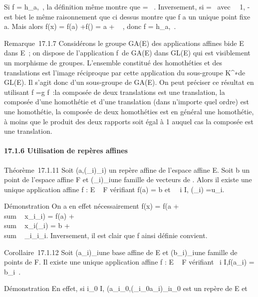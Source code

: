 \documentclass[]{article}
\begin{document}
Si f = h\_a,\lambda~, la définition même montre que
\vecf = \lambda~\mathrmId. Inversement,
si \vecf = \lambda~\mathrmId avec
\lambda~\neq~1, \vecf
-\mathrmId est bi\jmathective et le même raisonnement que
ci dessus montre que f a un unique point fixe a. Mais alors f(x) = f(a)
+\vec f(\overrightarrowax) = a + \lambda~
\overrightarrowax, donc f = h\_a,\lambda~.

Remarque~17.1.7 Considérons le groupe GA(E) des applications affines
bi\jmathectives de E dans E~; on dispose de l'application
f\mapsto~\vecf de GA(E) dans
GL(E) qui est visiblement un morphisme de groupes. L'ensemble constitué
des homothéties et des translations est l'image réciproque par cette
application du sous-groupe K^∗\mathrmId de
GL(E). Il s'agit donc d'un sous-groupe de GA(E). On peut préciser ce
résultat en utilisant \overrightarrowg \cdot f
=\vec g \cdot\vec f~:la composée de
deux translations est une translation, la composée d'une homothétie et
d'une translation (dans n'importe quel ordre) est une homothétie, la
composée de deux homothéties est en général une homothétie, à moins que
le produit des deux rapports soit égal à 1 auquel cas la composée est
une translation.

\paragraph{17.1.6 Utilisation de repères affines}

Théorème~17.1.11 Soit
(a,(\vece\_i)\_i\inI) un repère affine
de l'espace affine E. Soit b un point de l'espace affine F et
(\vecu\_i)\_i\inI une famille de
vecteurs de \overrightarrowF. Alors il existe une
unique application affine f : E \rightarrow~ F vérifiant f(a) = b et
\forall~~i \in I,
\vecf(\vece\_i)
=\vec u\_i.

Démonstration On a en effet nécessairement f(x) = f(a
+ \\sum ~
x\_i\vece\_i) = f(a)
+ \\sum ~
x\_i\vecf(\vece\_i)
= b + \\sum ~
\_i\inIx\_i\vecu\_i. Inversement,
il est clair que f ainsi définie convient.

Corollaire~17.1.12 Soit (a\_i)\_i\inI une base affine de E
et (b\_i)\_i\inI une famille de points de F. Il existe une
unique application affine f : E \rightarrow~ F vérifiant
\forall~i \in I,f(a\_i) = b\_i~.

Démonstration En effet, si i\_0 \in I,
(a\_i\_0,(\overrightarrowa\_i\_0a\_i)\_i\inI\diagdown\i\_0\)
est un repère de E et
\end{document}
